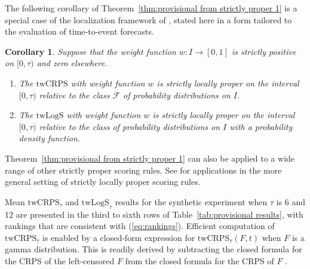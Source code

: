 \documentclass[10pt]{article} %
\theoremstyle{theorem}
\newtheorem{cor}{Corollary}
\theoremstyle{definition}
\newcommand{\twCRPS}{\mathrm{twCRPS}}
\newcommand{\twLogS}{\mathrm{twLogS}}
\begin{document}
The following corollary of Theorem~\ref{thm:provisional from strictly proper 1} is a special case of the localization framework of \citet{de2025localizing}, stated here in a form tailored to the evaluation of time-to-event forecasts.

\begin{cor}\label{cor:twCRPS}
Suppose that the weight function $w:I\to[0,1]$ is strictly positive on $[0,\tau)$ and zero elsewhere.
\begin{enumerate}
\item[(i)] The $\twCRPS$ with weight function $w$ is strictly locally proper on the interval $[0,\tau)$ relative to the class $\mathcal{F}$ of probability distributions on $I$.
\item[(ii)] The $\twLogS$ with weight function $w$ is strictly locally proper on the interval $[0,\tau)$ relative to the class of probability distributions on $I$ with a probability density function.
\end{enumerate}
\end{cor}

Theorem~\ref{thm:provisional from strictly proper 1} can also be applied to a wide range of other strictly proper scoring rules. See \cite{de2025localizing} for applications in the more general setting of strictly locally proper scoring rules.

Mean $\twCRPS_\tau$ and $\twLogS_\tau$ results for the synthetic experiment when $\tau$ is 6 and 12 are presented in the third to sixth rows of Table~\ref{tab:provisional results}, with rankings that are consistent with (\ref{eq:rankings}). Efficient computation of $\twCRPS_\tau$ is enabled by a closed-form expression for $\twCRPS_\tau(F,t)$ when $F$ is a gamma distribution. This is readily derived by subtracting the closed formula for the CRPS of the left-censored $F$ \citep[Eq~10]{scheuerer2015statistical} from the closed formula for the CRPS of $F$ \citep{scheuerer2015probabilistic}.
\end{document}
